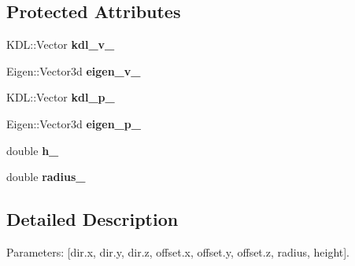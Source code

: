 \subsection*{Protected Attributes}
\begin{DoxyCompactItemize}
\item 
\hypertarget{classhiqp_1_1geometric__primitives_1_1GeometricCylinder_a4f14ff073aadefec06d354e5a4aa6a02}{K\-D\-L\-::\-Vector {\bfseries kdl\-\_\-v\-\_\-}}\label{classhiqp_1_1geometric__primitives_1_1GeometricCylinder_a4f14ff073aadefec06d354e5a4aa6a02}

\item 
\hypertarget{classhiqp_1_1geometric__primitives_1_1GeometricCylinder_a4f1ecaa9cb967a92875ba90ba5ee16cd}{Eigen\-::\-Vector3d {\bfseries eigen\-\_\-v\-\_\-}}\label{classhiqp_1_1geometric__primitives_1_1GeometricCylinder_a4f1ecaa9cb967a92875ba90ba5ee16cd}

\item 
\hypertarget{classhiqp_1_1geometric__primitives_1_1GeometricCylinder_af31a991daf4defbb80dad9a4ce7ffbe8}{K\-D\-L\-::\-Vector {\bfseries kdl\-\_\-p\-\_\-}}\label{classhiqp_1_1geometric__primitives_1_1GeometricCylinder_af31a991daf4defbb80dad9a4ce7ffbe8}

\item 
\hypertarget{classhiqp_1_1geometric__primitives_1_1GeometricCylinder_a0acb0c1f78254b5d05119192db73b364}{Eigen\-::\-Vector3d {\bfseries eigen\-\_\-p\-\_\-}}\label{classhiqp_1_1geometric__primitives_1_1GeometricCylinder_a0acb0c1f78254b5d05119192db73b364}

\item 
\hypertarget{classhiqp_1_1geometric__primitives_1_1GeometricCylinder_adf639620c8c52f76b999fcacb4191a68}{double {\bfseries h\-\_\-}}\label{classhiqp_1_1geometric__primitives_1_1GeometricCylinder_adf639620c8c52f76b999fcacb4191a68}

\item 
\hypertarget{classhiqp_1_1geometric__primitives_1_1GeometricCylinder_afa05dbc48e949a494aa3281e239bed73}{double {\bfseries radius\-\_\-}}\label{classhiqp_1_1geometric__primitives_1_1GeometricCylinder_afa05dbc48e949a494aa3281e239bed73}

\end{DoxyCompactItemize}


\subsection{Detailed Description}
Parameters\-: \mbox{[}dir.\-x, dir.\-y, dir.\-z, offset.\-x, offset.\-y, offset.\-z, radius, height\mbox{]}. 

